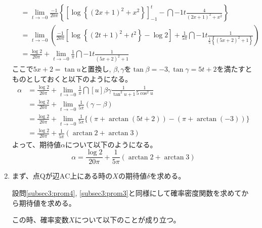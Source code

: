 \begin{enumerate}[(1)]
\begin{align*}
        &= \lim_{t \to -0}\frac{-1}{20\pi}\left\{\left[\log\left\{\left(2x + 1\right)^2 + x^2\right\}\right]_{-1}^{t} - \dint{-1}{t}{\frac{4}{\left(2x + 1\right)^2 + x^2}}\right\}\\
        &= \lim_{t \to -0}\left(\frac{-1}{20\pi}\left[\log\left\{\left(2t + 1\right)^2 + t^2\right\} - \log 2\right] + \frac{1}{5\pi}\dint{-1}{t}{\frac{1}{\frac{1}{5}\left\{\left(5x + 2\right)^2 + 1\right\}}}\right)\\
        &= \frac{\log 2}{20\pi} + \lim_{t \to -0}\frac{1}{\pi}\dint{-1}{t}{\frac{1}{\left(5x + 2\right)^2 + 1}}
    \end{align*}
    ここで$5x + 2 = \tan u$と置換し, $\beta, \gamma$を$\tan\beta = -3, \tan\gamma = 5t + 2$を満たすとものとしておくと以下のようになる。
    \begin{align*}
        \alpha &= \frac{\log 2}{20\pi} + \lim_{t \to -0}\frac{1}{\pi}\dint[u]{\beta}{\gamma}{\frac{1}{\tan^{2}u+ 1}\frac{1}{5\cos^{2}u}}\\
        &= \frac{\log 2}{20\pi} + \lim_{t \to -0}\frac{1}{5\pi}(\gamma - \beta)\\
        &= \frac{\log 2}{20\pi} + \lim_{t \to -0}\frac{1}{5\pi}\bigl\{(\pi + \arctan(5t + 2)) - (\pi + \arctan(-3))\bigr\}\\
        &= \frac{\log 2}{20\pi} + \frac{1}{5\pi}(\arctan 2 + \arctan 3)
    \end{align*}
    よって、期待値$\alpha$について以下のようになる。
    \begin{equation}
        \alpha = \frac{\log 2}{20\pi} + \frac{1}{5\pi}(\arctan 2 + \arctan 3)\label{eq:subsec3:prom4:ans}
    \end{equation}
    \item まず、点$\mathrm{Q}$が辺$\mathrm{AC}$上にある時の$X$の期待値$\delta$を求める。
    
    設問\eqref{subsec3:prom4}, \eqref{subsec3:prom3}と同様にして確率密度関数を求めてから期待値を求める。

    この時、確率変数$X$について以下のことが成り立つ。
    

\end{enumerate}
